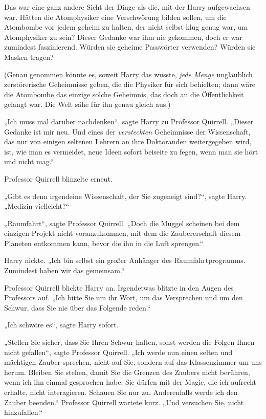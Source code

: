 {Das war eine ganz andere Sicht der Dinge als die, mit der Harry aufgewachsen war. Hätten die Atomphysiker eine Verschwörung bilden sollen, um die Atombombe vor jedem geheim zu halten, der nicht selbst klug genug war, um Atomphysiker zu sein? Dieser Gedanke war ihm nie gekommen, doch er war zumindest faszinierend. Würden sie geheime Passwörter verwenden? Würden sie Masken tragen?

(Genau genommen könnte es, soweit Harry das wusste, \emph{jede Menge} unglaublich zerstörerische Geheimnisse geben, die die Physiker für sich behielten; dann wäre die Atombombe das einzige solche Geheimnis, das doch an die Öffentlichkeit gelangt war. Die Welt sähe für ihn genau gleich aus.)

„Ich muss mal darüber nachdenken“, sagte Harry zu Professor Quirrell. „Dieser Gedanke ist mir neu. Und eines der \emph{versteckten} Geheimnisse der Wissenschaft, das nur von einigen seltenen Lehrern an ihre Doktoranden weitergegeben wird, ist, wie man es vermeidet, neue Ideen sofort beiseite zu fegen, wenn man sie hört und nicht mag.“

Professor Quirrell blinzelte erneut.

„Gibt es denn irgendeine Wissenschaft, der Sie zugeneigt sind?“, sagte Harry. „Medizin vielleicht?“

„Raumfahrt“, sagte Professor Quirrell. „Doch die Muggel scheinen bei dem einzigen Projekt nicht voranzukommen, mit dem die Zaubererschaft diesem Planeten entkommen kann, bevor die ihn in die Luft sprengen.“

Harry nickte. „Ich bin selbst ein großer Anhänger des Raumfahrtprogramms. Zumindest haben wir das gemeinsam.“

Professor Quirrell blickte Harry an. Irgendetwas blitzte in den Augen des Professors auf. „Ich bitte Sie um ihr Wort, um das Versprechen und um den Schwur, dass Sie nie über das Folgende reden.“

„Ich schwöre es“, sagte Harry sofort.

„Stellen Sie sicher, dass Sie Ihren Schwur halten, sonst werden die Folgen Ihnen nicht gefallen“, sagte Professor Quirrell. „Ich werde nun einen selten und mächtigen Zauber sprechen, nicht auf Sie, sondern auf das Klassenzimmer um uns herum. Bleiben Sie stehen, damit Sie die Grenzen des Zaubers nicht berühren, wenn ich ihn einmal gesprochen habe. Sie dürfen mit der Magie, die ich aufrecht erhalte, nicht interagieren. Schauen Sie nur zu. Anderenfalls werde ich den Zauber beenden.“ Professor Quirrell wartete kurz. „Und versuchen Sie, nicht hinzufallen.“

}
